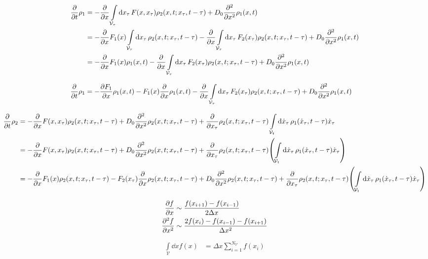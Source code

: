 \documentclass[a4paper,10pt]{article}
\newcommand{\suml}{\sum\limits}
\newcommand{\intl}{\int\limits}
\begin{document}
\begin{align}
	\pdv{t}
	\rho_1
	&=
	-
	\pdv{x}
	\intl_{\mathcal{V}_\tau}
	\dd{x_\tau}
	F(x,x_\tau)
	\rho_2
	(x,t;x_\tau,t-\tau)
	+
	D_0
	\pdv[2]{x}
	\rho_1(x,t)
\\
	&=
	-
	\pdv{x}
	F_1(x)
	\intl_{\mathcal{V}_\tau}
	\dd{x_\tau}
	\rho_2
	(x,t;x_\tau,t-\tau)
	-
	\pdv{x}
	\intl_{\mathcal{V}_\tau}
	\dd{x_\tau}
	F_2(x_\tau)
	\rho_2
	(x,t;x_\tau,t-\tau)	
	+
	D_0
	\pdv[2]{x}
	\rho_1(x,t)
\\
	&=
	-
	\pdv{x}
	F_1(x)
	\rho_1
	(x,t)
	-
	\pdv{x}
	\intl_{\mathcal{V}_\tau}
	\dd{x_\tau}
	F_2(x_\tau)
	\rho_2
	(x,t;x_\tau,t-\tau)	
	+
	D_0
	\pdv[2]{x}
	\rho_1(x,t)
\end{align}

\begin{align}
	\pdv{t}
	\rho_1
	&=
	-
	\pdv{F_1}{x}
	\rho_1
	(x,t)
	-
	F_1(x)
	\pdv{x}
	\rho_1
	(x,t)
	-
	\pdv{x}
	\intl_{\mathcal{V}_\tau}
	\dd{x_\tau}
	F_2(x_\tau)
	\rho_2
	(x,t;x_\tau,t-\tau)	
	+
	D_0
	\pdv[2]{x}
	\rho_1(x,t)
\end{align}


\begin{align}
	\pdv{t}
	\rho_2
	&=
	-
	\pdv{x}
	F(x,x_\tau)
	\rho_2
	(x,t;x_\tau,t-\tau)
	+
	D_0
	\pdv[2]{x}
	\rho_2
	(x,t;x_\tau,t-\tau)
	+
	\pdv{x_\tau}
	\rho_2
	(x,t;x_\tau,t-\tau)
	\intl_{\mathcal{V}_t}
	\dd{\dot{x}_\tau}
	\rho_1
	(\dot{x}_\tau,t-\tau)
	\dot{x}_\tau
\\
	&=
	-
	\pdv{x}
	F(x,x_\tau)
	\rho_2
	(x,t;x_\tau,t-\tau)
	+
	D_0
	\pdv[2]{x}
	\rho_2
	(x,t;x_\tau,t-\tau)
	+
	\pdv{x_\tau}
	\rho_2
	(x,t;x_\tau,t-\tau)
	\pqty{
		\intl_{\mathcal{V}_t}
		\dd{\dot{x}_\tau}
		\rho_1
		(\dot{x}_\tau,t-\tau)
		\dot{x}_\tau
	}
\\
	&=
	-
	\pdv{x}
	F_1(x)
	\rho_2
	(x,t;x_\tau,t-\tau)
	-
	F_2(x_\tau)
	\pdv{x}
	\rho_2
	(x,t;x_\tau,t-\tau)
	+
	D_0
	\pdv[2]{x}
	\rho_2
	(x,t;x_\tau,t-\tau)
	+
	\pdv{x_\tau}
	\rho_2
	(x,t;x_\tau,t-\tau)
	\pqty{
		\intl_{\mathcal{V}_t}
		\dd{\dot{x}_\tau}
		\rho_1
		(\dot{x}_\tau,t-\tau)
		\dot{x}_\tau
	}
\end{align}

\begin{align}
	\pdv{f}{x}
	&\sim
	\frac{f(x_{i+1})-f(x_{i-1})}{2\Delta x}
\\
	\pdv[2]{f}{x}
	&\sim
	\frac{2f(x_{i})-f(x_{i-1})-f(x_{i+1})}{\Delta x^2}
\end{align}

\begin{align}
	\intl_{\mathcal{V}}
	\dd{x}
	f(x)
	&=
	\Delta x
	\suml_{i=1}^{N_\mathcal{V}}
	f(x_i)
\end{align}
\end{document}
